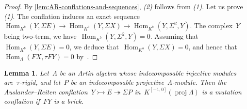 \documentclass{amsart}
\newtheorem{lemma}[theorem]{Lemma}
\theoremstyle{definition}
\newcommand{\Hom}[1]{\operatorname{Hom}_{#1}}
\newcommand{\susp}{\Sigma}
\newcommand{\proj}{\operatorname{proj}}
\newcommand{\infl}{\rightarrowtail}
\newcommand{\defl}{\twoheadrightarrow}
\begin{document}
\begin{proof}
By \cref{lem:AR-conflations-and-sequences}, \emph{(2)} follows from \emph{(1)}.
Let us prove \emph{(1)}.
The conflation induces an exact sequence~$\Hom{K^b}(Y,\susp E) \to \Hom{K^b}(Y,\susp X) \to \Hom{K^b}(Y,\susp^2,Y)$.
The complex~$Y$ being two-term, we have~$\Hom{K^b}(Y,\susp^2,Y)=0$.
Assuming that~$\Hom{K^b}(Y,\susp E)=0$, we deduce that~$\Hom{K^b}(Y,\susp X)=0$, and hence that~$\Hom{\Lambda}(FX,\tau FY) = 0$ by~\cite[Lem.~3.4]{AdachiIyamaReiten}.
\end{proof}

% 

\begin{lemma}
\label{lem:initial meshes}
Let~$\Lambda$ be an Artin algebra whose indecomposable injective modules are~$\tau$-rigid, and let~$P$ be an indecomposable projective~$\Lambda$-module.
Then the Auslander--Reiten conflation~${Y\infl E\defl \susp P}$ in~$K^{[-1,0]}(\proj\Lambda)$ is a mutation conflation if~$FY$ is a brick.
\end{lemma}
\end{document}
